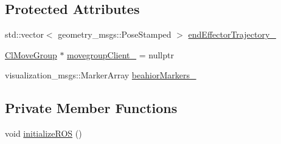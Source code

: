 \subsection*{Protected Attributes}
\begin{DoxyCompactItemize}
\item 
std\+::vector$<$ geometry\+\_\+msgs\+::\+Pose\+Stamped $>$ \hyperlink{classcl__move__group__interface_1_1CbMoveEndEffectorTrajectory_ae13dfd31ea3660646e03882f0c2c29f0}{end\+Effector\+Trajectory\+\_\+}
\item 
\hyperlink{classcl__move__group__interface_1_1ClMoveGroup}{Cl\+Move\+Group} $\ast$ \hyperlink{classcl__move__group__interface_1_1CbMoveEndEffectorTrajectory_aea650d3e7836125b32be97392b71a7f3}{movegroup\+Client\+\_\+} = nullptr
\item 
visualization\+\_\+msgs\+::\+Marker\+Array \hyperlink{classcl__move__group__interface_1_1CbMoveEndEffectorTrajectory_a809fb5385adf27c0a1c8f8136566949c}{beahior\+Markers\+\_\+}
\end{DoxyCompactItemize}
\subsection*{Private Member Functions}
\begin{DoxyCompactItemize}
\item 
void \hyperlink{classcl__move__group__interface_1_1CbMoveEndEffectorTrajectory_afcee8f3853a5cef8806137a304c8a14b}{initialize\+R\+OS} ()
\end{DoxyCompactItemize}
